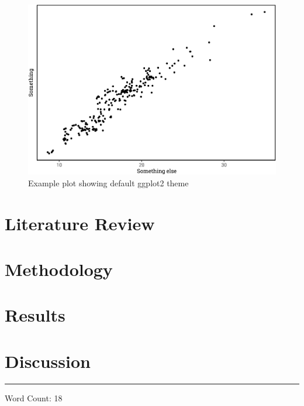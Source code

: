 \documentclass[a4paper, notitlepage]{extreport}
\begin{document}
\begin{figure}[tb]

{\centering \includegraphics[width=.75\linewidth]{skeleton_files/figure-latex/plot-1} 

}

\caption{Example plot showing default ggplot2 theme}\label{fig:plot}
\end{figure}

\lipsum

\hypertarget{literature-review}{%
\chapter{Literature Review}\label{literature-review}}

\lipsum

\hypertarget{methodology}{%
\chapter{Methodology}\label{methodology}}

\lipsum

\hypertarget{results}{%
\chapter{Results}\label{results}}

\lipsum

\hypertarget{discussion}{%
\chapter{Discussion}\label{discussion}}

\lipsum

\nocite{tidyverse,devtools,Hmisc,PerformanceAnalytics,ggthemes,RStoolbox,broom,viridis,viridisLite,ggpubr,magrittr,sf,kableExtra,scales,lidR,raster,nvimcom,varhandle,future,rgdal,pbapply,cowplot,bibtex,benchmarkme,parallel,showtext,data.table,wesanderson}

\noindent

\rule{2cm}{0.4pt}

Word Count: 18


\linespread{1}

\end{document}

